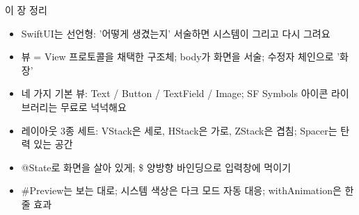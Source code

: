 \begin{tcbsummary}{이 장 정리}
\begin{itemize}
  \item SwiftUI는 선언형: '어떻게 생겼는지' 서술하면 시스템이 그리고 다시 그려요
  \item 뷰 = View 프로토콜을 채택한 구조체; body가 화면을 서술; 수정자 체인으로 '화장'
  \item 네 가지 기본 뷰: Text / Button / TextField / Image; SF Symbols 아이콘 라이브러리는 무료로 넉넉해요
  \item 레이아웃 3종 세트: VStack은 세로, HStack은 가로, ZStack은 겹침; Spacer는 탄력 있는 공간
  \item @State로 화면을 살아 있게; \$ 양방향 바인딩으로 입력창에 먹이기
  \item \#Preview는 보는 대로; 시스템 색상은 다크 모드 자동 대응; withAnimation은 한 줄 효과
\end{itemize}

\end{tcbsummary}
